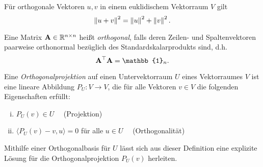 \begin{thm}
\label{pythagoras}
Für orthogonale Vektoren $u,v$ in einem euklidischem Vektorraum $V$ gilt
$$\left\lVert u+v \right\rVert^2 = \left\lVert u \right\rVert^2 + \left\lVert v \right\rVert^2.$$
\end{thm}



\begin{defn}
Eine Matrix $\mathbf{A} \in \mathbb{R}^{n \times n}$ heißt 		\textit{orthogonal}, falls deren Zeilen- und Spaltenvektoren paarweise orthonormal bezüglich des Standardskalarprodukts sind, d.h.
$$\mat A^{\top} \mat A = \mathbb{1}_n.$$
\end{defn}

\begin{defn}
Eine \textit{Orthogonalprojektion} auf einen Untervektorraum $U$ eines Vektorraumes $V$ ist eine lineare Abbildung $P_U \colon V \rightarrow V$, die für alle Vektoren $v \in V$ die folgenden Eigenschaften erfüllt:
\begin{enumerate}[(i)]
\item $P_U(v) \in U \quad$ (Projektion)
\item $\langle P_U(v) - v , u \rangle = 0$ für alle $u \in U \quad$ (Orthogonalität)
\end{enumerate}
\end{defn}

Mithilfe einer Orthogonalbasis für $U$ lässt sich aus dieser Definition eine explizite Lösung für die Orthogonalprojektion $P_U(v)$ herleiten.

